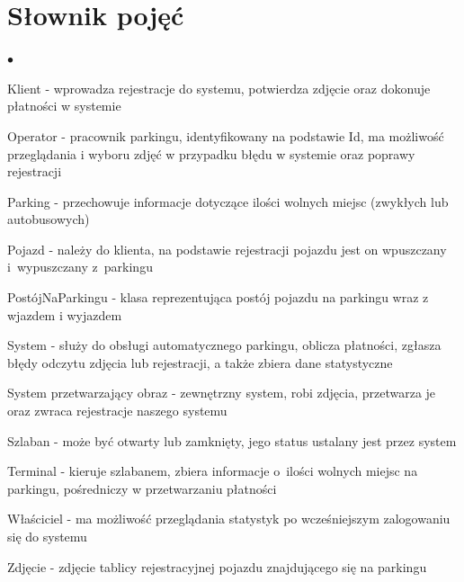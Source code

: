 
\section{Słownik pojęć}
\label{sec:slownik}

\begin{list}{$\bullet$}{}
\item Klient - wprowadza rejestracje do systemu, potwierdza zdjęcie oraz dokonuje płatności w systemie
\item Operator - pracownik parkingu, identyfikowany na podstawie Id, ma możliwość przeglądania i wyboru zdjęć w przypadku błędu w systemie oraz poprawy rejestracji
\item Parking - przechowuje informacje dotyczące ilości wolnych miejsc (zwykłych lub autobusowych)
\item Pojazd - należy do klienta, na podstawie rejestracji pojazdu jest on wpuszczany i~wypuszczany z~parkingu
\item PostójNaParkingu - klasa reprezentująca postój pojazdu na parkingu wraz z wjazdem i wyjazdem
\item System - służy do obsługi automatycznego parkingu, oblicza płatności, zgłasza błędy odczytu zdjęcia lub rejestracji, a także zbiera dane statystyczne
\item System przetwarzający obraz - zewnętrzny system, robi zdjęcia, przetwarza je oraz zwraca rejestracje naszego systemu
\item Szlaban - może być otwarty lub zamknięty, jego status ustalany jest przez system
\item Terminal - kieruje szlabanem, zbiera informacje o~ilości wolnych miejsc na parkingu, pośredniczy w przetwarzaniu płatności
\item Właściciel - ma możliwość przeglądania statystyk po wcześniejszym zalogowaniu się do systemu
\item Zdjęcie - zdjęcie tablicy rejestracyjnej pojazdu znajdującego się na parkingu
\end{list}

